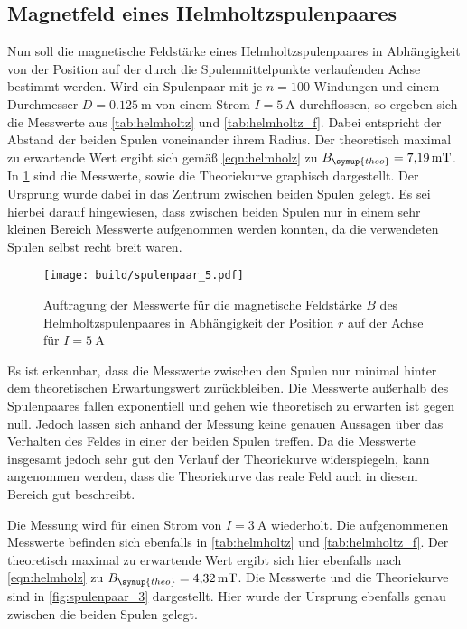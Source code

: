 \newpage
\subsection{Magnetfeld eines Helmholtzspulenpaares}

Nun soll die magnetische Feldstärke eines Helmholtzspulenpaares in Abhängigkeit von
der Position auf der durch die Spulenmittelpunkte verlaufenden Achse bestimmt werden.
Wird ein Spulenpaar mit je $n=100$ Windungen und einem Durchmesser $D=\SI{0,125}{\metre}$
von einem Strom $I=\SI{5}{\ampere}$ durchflossen, so ergeben sich die Messwerte aus \ref{tab:helmholtz}
und \ref{tab:helmholtz_f}.
Dabei entspricht der Abstand der beiden Spulen voneinander ihrem Radius.
Der theoretisch maximal zu erwartende Wert ergibt sich gemäß \ref{eqn:helmholz} zu $B_{\symup{theo}}=\SI{7,19}{\milli\tesla}$. In
\ref{fig:spulenpaar_5} sind die Messwerte, sowie die Theoriekurve graphisch dargestellt. Der Ursprung wurde
dabei in das Zentrum zwischen beiden Spulen gelegt. Es sei hierbei darauf
hingewiesen, dass zwischen beiden Spulen nur in einem sehr kleinen Bereich Messwerte
aufgenommen werden konnten, da die verwendeten Spulen selbst recht breit waren.

\begin{figure}
  \centering
  \texttt{[image: build/spulenpaar\_5.pdf]}
  \caption{Auftragung der Messwerte für die magnetische Feldstärke $B$ des Helmholtzspulenpaares
  in Abhängigkeit der Position $r$ auf der Achse für $I=\SI{5}{\ampere}$}
  \label{fig:spulenpaar_5}
\end{figure}

Es ist erkennbar, dass die Messwerte zwischen den Spulen nur minimal hinter dem theoretischen Erwartungswert
zurückbleiben. Die Messwerte außerhalb des Spulenpaares fallen exponentiell und gehen
wie theoretisch zu erwarten ist gegen null. Jedoch lassen sich anhand der Messung keine
genauen Aussagen über das Verhalten des Feldes in einer der beiden Spulen treffen.
Da die Messwerte insgesamt jedoch sehr gut den Verlauf der Theoriekurve widerspiegeln,
kann angenommen werden, dass die Theoriekurve das reale Feld auch in diesem Bereich gut beschreibt.


Die Messung wird für einen Strom von $I=\SI{3}{\ampere}$ wiederholt. Die aufgenommenen Messwerte
befinden sich ebenfalls in \ref{tab:helmholtz} und \ref{tab:helmholtz_f}. Der theoretisch maximal zu
erwartende Wert ergibt sich hier ebenfalls nach \ref{eqn:helmholz} zu $B_{\symup{theo}}=\SI{4,32}{\milli\tesla}$. Die Messwerte
und die Theoriekurve sind in \ref{fig:spulenpaar_3} dargestellt. Hier wurde der Ursprung ebenfalls genau
zwischen die beiden Spulen gelegt.

